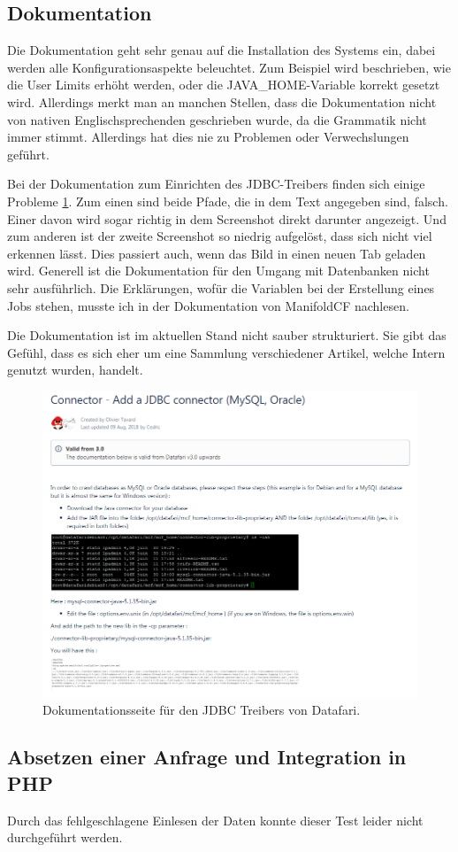 \subsection{Dokumentation}

Die Dokumentation geht sehr genau auf die Installation des Systems ein, dabei werden alle Konfigurationsaspekte beleuchtet. Zum Beispiel wird beschrieben, wie die User Limits erhöht werden, oder die JAVA\_HOME-Variable korrekt gesetzt wird. Allerdings merkt man an manchen Stellen, dass die Dokumentation nicht von nativen Englischsprechenden geschrieben wurde, da die Grammatik nicht immer stimmt. Allerdings hat dies nie zu Problemen oder Verwechslungen geführt.

Bei der Dokumentation zum Einrichten des JDBC-Treibers finden sich einige Probleme \ref{img:datafariJDBC}. Zum einen sind beide Pfade, die in dem Text angegeben sind, falsch. Einer davon wird sogar richtig in dem Screenshot direkt darunter angezeigt. Und zum anderen ist der zweite Screenshot so niedrig aufgelöst, dass sich nicht viel erkennen lässt. Dies passiert auch, wenn das Bild in einen neuen Tab geladen wird. Generell ist die Dokumentation für den Umgang mit Datenbanken nicht sehr ausführlich. Die Erklärungen, wofür die Variablen bei der Erstellung eines Jobs stehen, musste ich in der Dokumentation von ManifoldCF nachlesen.

Die Dokumentation ist im aktuellen Stand nicht sauber strukturiert. Sie gibt das Gefühl, dass es sich eher um eine Sammlung verschiedener Artikel, welche Intern genutzt wurden, handelt.

\begin{figure}
	\centering
	\includegraphics[width=1\linewidth]{images/datafari_doku_wrong_path.png}
	\caption{Dokumentationsseite für den JDBC Treibers von Datafari.}
	\label{img:datafariJDBC}
\end{figure}


\subsection{Absetzen einer Anfrage und Integration in PHP}

Durch das fehlgeschlagene Einlesen der Daten konnte dieser Test leider nicht durchgeführt werden.
